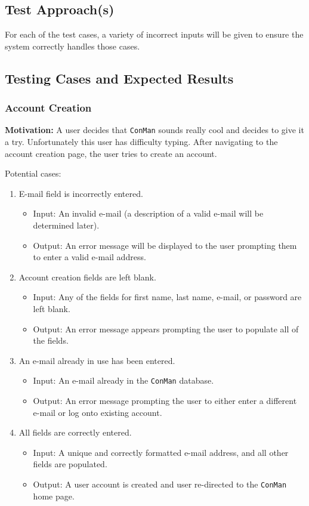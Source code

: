 \documentclass{article}
\begin{document}
\subsection{Test Approach(s)}
For each of the test cases, a variety of incorrect inputs will be given to ensure the system correctly handles those cases.


\subsection{Testing Cases and Expected Results}
\subsubsection{Account Creation}
\textbf{Motivation:} A user decides that \texttt{ConMan}
sounds really cool and decides to give it a try. Unfortunately this user has difficulty typing. 
After navigating to the account
creation page, the user tries to create an account.

Potential cases:
\begin{enumerate}
    \item E-mail field is incorrectly entered.
        \begin{itemize}
            \item Input: An invalid e-mail (a description of a valid e-mail
will be determined later).
            \item Output: An error message will be displayed to the user
prompting them to enter a valid e-mail address.
        \end{itemize}
    \item Account creation fields are left blank.
        \begin{itemize}
            \item Input: Any of the fields for first name, last name, e-mail,
or password are left blank.
            \item Output: An error message appears prompting the user to
populate all of the fields.
        \end{itemize}
    \item An e-mail already in use has been entered.
        \begin{itemize}
            \item Input: An e-mail already in the \texttt{ConMan} database.
            \item Output: An error message prompting the user to either enter
a different e-mail or log onto existing account.
        \end{itemize}
    \item All fields are correctly entered.
        \begin{itemize}
            \item Input: A unique and correctly formatted e-mail address, and
all other fields are populated.
            \item Output: A user account is created and user re-directed to
the \texttt{ConMan} home page.
        \end{itemize}
\end{enumerate}
\end{document}
